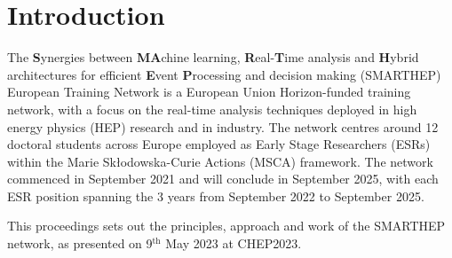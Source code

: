 \section{Introduction}
\label{intro}
The \textbf{S}ynergies between \textbf{MA}chine learning, \textbf{R}eal-\textbf{T}ime analysis and \textbf{H}ybrid architectures for efficient \textbf{E}vent \textbf{P}rocessing and decision making (SMARTHEP) European Training Network is a European Union Horizon-funded training network, with a focus on the real-time analysis techniques deployed in high energy physics (HEP) research and in industry. The network centres around 12 doctoral students across Europe employed as Early Stage Researchers (ESRs) within the Marie Sk{\l}odowska-Curie Actions (MSCA) framework. The network commenced in September 2021 and will conclude in September 2025, with each ESR position spanning the 3 years from September 2022 to September 2025.\par
This proceedings sets out the principles, approach and work of the SMARTHEP network, as presented on 9${}^\text{th}$ May 2023 at CHEP2023.